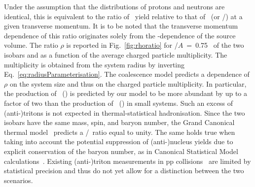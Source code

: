 \documentclass[%
 reprint,
 amsmath,amssymb,
 aps,
]{revtex4-1}
\begin{document}
\noindent Under the assumption that the distributions of protons and neutrons are identical, this is equivalent to the ratio of \tritium~yield relative to that of \hethree~(or \antitritium/\antihethree) at a given transverse momentum. It is to be noted that the transverse momentum dependence of this ratio originates solely from the \pt-dependence of the source volume. 
The ratio $\rho$ is reported in Fig.~\ref{fig:rhoratio} for \pt/$A$~=~0.75 \GeVc~of the two isobars and as a function of the average charged particle multiplicity. 
The multiplicity is obtained from the system radius by inverting Eq.~\ref{eq:radiusParameterisation}.
The coalescence model predicts a dependence of $\rho$ on the system size and thus on the charged particle multiplicity. In particular, the production of \tritium~(\antitritium) is predicted by our model to be more abundant by up to a factor of two than the production of \hethree~(\antihethree) in small systems. Such an excess of (anti-)tritons is not expected in thermal-statistical hadronisation. Since the two isobars have the same mass, spin, and baryon number, the Grand Canonical thermal model~\cite{Andronic:2010qu,Andronic:2017} predicts a \tritium/\hethree~ratio equal to unity. The same holds true when taking into account the potential suppression of \mbox{(anti-)nucleus} yields due to explicit conservation of the baryon number, as in Canonical Statistical Model calculations~\cite{Vovchenko:2018fiy}.
Existing (anti-)triton measurements in pp collisions~\cite{ALICE:nucleipp2017} are limited by statistical precision and thus do not yet allow for a distinction between the two scenarios.
\end{document}
